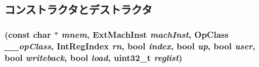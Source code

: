 \subsection{コンストラクタとデストラクタ}
\hypertarget{classArmISA_1_1MacroMemOp_a008eeb85abf61c91301851bc54b7a726}{
\subsubsection[{MacroMemOp}]{ (const char $\ast$ {\em mnem}, \/  {\bf ExtMachInst} {\em machInst}, \/  OpClass {\em \_\-\_\-opClass}, \/  {\bf IntRegIndex} {\em rn}, \/  bool {\em index}, \/  bool {\em up}, \/  bool {\em user}, \/  bool {\em writeback}, \/  bool {\em load}, \/  {\bf uint32\_\-t} {\em reglist})}}
\label{classArmISA_1_1MacroMemOp_a008eeb85abf61c91301851bc54b7a726}



